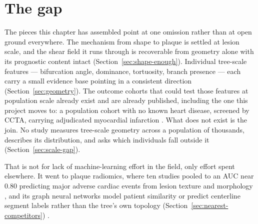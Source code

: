 %

\section{The gap}
\label{sec:the-gap}

The pieces this chapter has assembled point at one omission rather than at open ground everywhere.
The mechanism from shape to plaque is settled at lesion scale, and the shear field it runs through is
recoverable from geometry alone with its prognostic content intact
(Section~\ref{sec:shape-enough}).
Individual tree-scale features --- bifurcation angle, dominance, tortuosity, branch presence --- each
carry a small evidence base pointing in a consistent direction (Section~\ref{sec:geometry}).
The outcome cohorts that could test those features at population scale already exist and are already
published, including the one this project moves to: a population cohort with no known heart
disease, screened by CCTA, carrying adjudicated myocardial infarction \cite{fuchs2023cgps}.
What does not exist is the join.
No study measures tree-scale geometry across a population of thousands, describes its distribution,
and asks which individuals fall outside it (Section~\ref{sec:scale-gap}).

That is not for lack of machine-learning effort in the field, only effort spent elsewhere.
It went to plaque radiomics, where ten studies pooled to an AUC near 0.80 predicting major adverse
cardiac events from lesion texture and morphology \cite{ma2025mlmace}, and its graph neural networks
model patient similarity or predict centerline segment labels rather than the tree's own topology
(Section~\ref{sec:nearest-competitors}) \cite{yaseliani2025gnn}.

